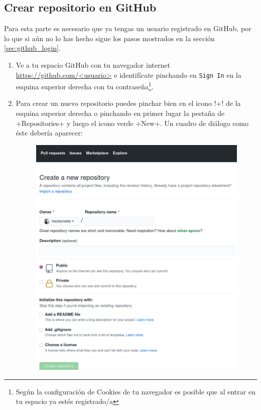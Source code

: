 \documentclass[a5paper, oneside,10pt]{article}
\begin{document}
    \subsection{Crear repositorio en GitHub}
      Para esta parte es necesario que ya tengas un usuario registrado en GitHub, por lo que si  aún no lo has hecho sigue los pasos mostrados en la sección \ref{sec:github_login}.
      
      \begin{enumerate}
       \item Ve a tu espacio GitHub con tu navegador internet \url{https://github.com/<usuario>} e identifícate pinchando en \verb+Sign In+ en la esquina superior derecha con tu contraseña\footnote{Según la configuración de Cookies de tu navegador es posible que al entrar en tu espacio ya estés registrado/a}.
       \item Para crear un nuevo repositorio puedes pinchar bien en el icono \cverb!+! de la esquina superior derecha o pinchando en primer lugar la pestaña de \cverb+Repositories+ y luego el icono verde \cverb+New+. Un cuadro de diálogo como éste debería aparecer:
       
       \begin{figure}[H]\centering
        \hspace{-1cm}\includegraphics[width=1.2\columnwidth]{github_create_new_repo}
       \end{figure}
       

\end{enumerate}
\end{document}
